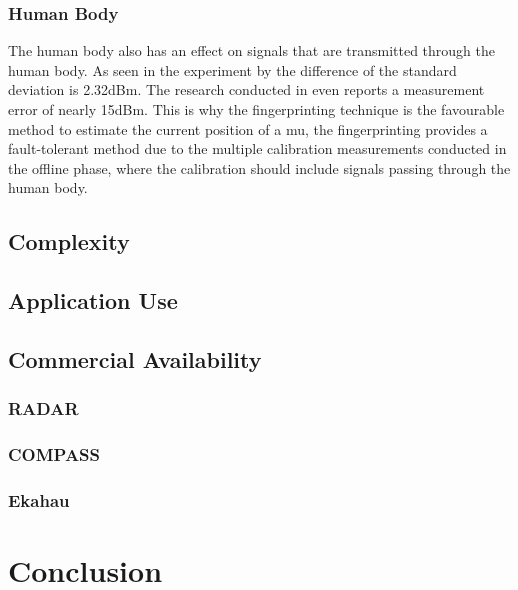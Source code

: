 \subsubsection{Human Body}
The human body also has an effect on signals that are transmitted through the human body. As seen in the experiment by \cite{S2016} the difference of the standard deviation is 2.32dBm. The research conducted in \cite{Mautz} even reports a measurement error of nearly 15dBm.
This is why the fingerprinting technique is the favourable method to estimate the current position of a \acrlong{mu}, the fingerprinting provides a fault-tolerant method due to the multiple calibration measurements conducted in the offline phase, where the calibration should include signals passing through the human body.
\subsection{Complexity}
\subsection{Application Use}
\subsection{Commercial Availability}
\subsubsection{RADAR}
\subsubsection{COMPASS}
\subsubsection{Ekahau}
\section{Conclusion}

